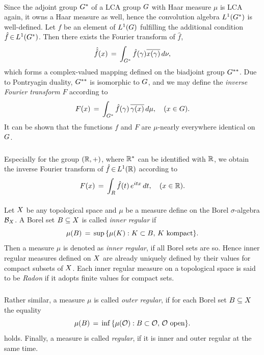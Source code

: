 \documentclass[11pt,twoside]{article}
\begin{document}
\paragraph{}
Since the adjoint group $G^*$ of a LCA group $G$
with Haar measure $\mu$ is LCA again,
it owns a Haar measure as well,
hence the convolution algebra $L^1(G^*)$ is well-defined.
Let $f$ be an element of $L^1(G)$
fulfilling the additional condition $\hat{f} {\,\in\,} L^1(G^*)$.
Then there exists the Fourier transform of $\hat{f}$,
\[
\hat{\hat{f}}(x) \,=\, 
\int_{G^*} \hat{f}(\gamma) \overline{x(\gamma)} \, d\nu,
\]
which forms a complex-valued mapping
defined on the biadjoint group $G^{**}$.
Due to Pontryagin duality,
$G^{**}$ is isomorphic to $G$,
and we may define the \textit{inverse Fourier transform} $F$
according to
\[
F(x) \,=\, \int_{G^*} \hat{f}(\gamma) \, \overline{\gamma(x)} \, d \mu,
\quad (x \in G).
\]
It can be shown that the functions $f$ and $F$ are $\mu$-nearly everywhere
identical on $G$.

\subparagraph{}
Especially for the group $({\mathbb{R}},+)$,
where ${\mathbb{R}}^*$ can be identified with ${\mathbb{R}}$,
we obtain the inverse Fourier transform of $\hat{f} {\,\in\,} L^1({\mathbb{R}})$ according to
\[
F(x) \,=\, \int_R \hat{f}(t) \, e^{itx} \, dt, \quad (x \in {\mathbb{R}}).
\]

\paragraph{} %
Let $X$ be any topological space and $\mu$ be a measure
define on the Borel $\sigma$-algebra ${\mathcal{B}}_{X}$.
A Borel set $B \subseteq X$ is called \textit{inner regular} if
\[
\mu(B) \,=\, \sup \,
          \{\mu({K}): {K} \subset B, \, {K} \mbox{ kompact}\}.
\]
Then a measure $\mu$ is denoted as \textit{inner regular},
if all Borel sets are so.
Hence inner regular measures defined on $X$ are already uniquely
defined by their values for compact subsets of $X$.
Each inner regular measure on a topological space is said to be \textit{Radon}
if it adopts finite values for compact sets.

\subparagraph{}
Rather similar,
a measure $\mu$ is called \textit{outer regular},
if for each Borel set $B \subseteq X$ the equality
\[
\mu(B) \,=\, \inf \,
          \{\mu(\mathcal{O}): B \subset \mathcal{O}, \, \mathcal{O} \mbox{ open} \}.
\]
holds.
Finally,
a measure is called \textit{regular},
if it is inner and outer regular at the same time.
\end{document}
